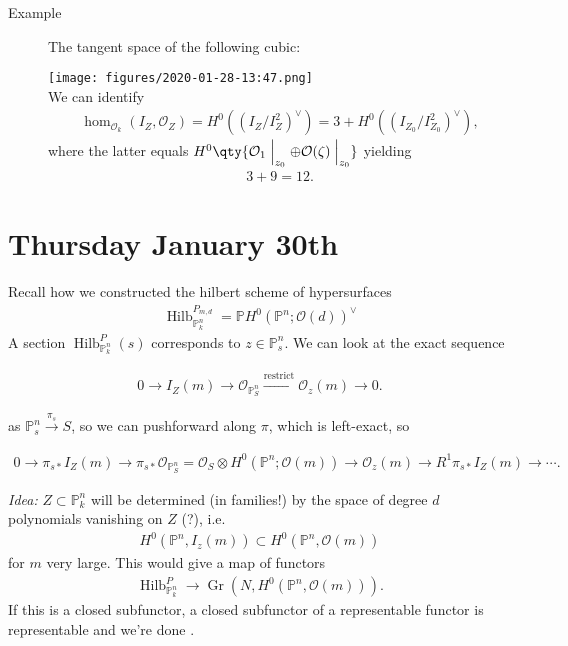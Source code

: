 \begin{description}
\item[Example]
The tangent space of the following cubic:

\texttt{[image: figures/2020-01-28-13:47.png]}\\

We can identify
\begin{align*}
\hom_{{\mathcal{O}}_k}(I_Z, {\mathcal{O}}_Z) = H^0((I_Z/I_Z^2)^\vee) = 3 + H^0((I_{Z_0}/I_{Z_0}^2)^\vee)
,\end{align*}
where the latter equals
\(H^0 \qty{ {\mathcal{O}}_1\mathrel{\Big|}_{z_0} \oplus {\mathcal{O}}(\zeta)\mathrel{\Big|}_{z_0} }\)
yielding
\begin{align*}
3+9 = 12
.\end{align*}
\end{description}

\hypertarget{thursday-january-30th}{%
\section{Thursday January 30th}\label{thursday-january-30th}}

Recall how we constructed the hilbert scheme of hypersurfaces
\begin{align*}
\operatorname{Hilb}_{{\mathbb{P}}_k^n}^{P_{m, d}} = {\mathbb{P}}H^0({\mathbb{P}}^n; {\mathcal{O}}(d))^\vee
\end{align*}
A section \(\operatorname{Hilb}_{{\mathbb{P}}_k^n}^{P}(s)\) corresponds
to \(z\in {\mathbb{P}}^n_s\). We can look at the exact sequence

\begin{align*} 0 \to I_Z(m) \to {\mathcal{O}}_{{\mathbb{P}}_S^n} \xrightarrow{\text{restrict}} {\mathcal{O}}_z(m) \to 0 .\end{align*}

as \({\mathbb{P}}_s^n \xrightarrow{\pi_s} S\), so we can pushforward
along \(\pi\), which is left-exact, so

\begin{align*} 0 \to \pi_{s*} I_Z(m) \to \pi_{s*} {\mathcal{O}}_{{\mathbb{P}}_S^n}  = {\mathcal{O}}_S \otimes H^0({\mathbb{P}}^n; {\mathcal{O}}(m)) \to {\mathcal{O}}_z(m) \to R^1 \pi_{s*} I_Z(m) \to \cdots .\end{align*}

\emph{Idea:} \(Z \subset {\mathbb{P}}_k^n\) will be determined (in
families!) by the space of degree \(d\) polynomials vanishing on \(Z\)
(?), i.e.
\begin{align*}
H^0({\mathbb{P}}^n, I_z(m)) \subset H^0({\mathbb{P}}^n, {\mathcal{O}}(m))
\end{align*}
for \(m\) very large. This would give a map of functors
\begin{align*}
\operatorname{Hilb}_{{\mathbb{P}}_k^n}^{P} \to {\operatorname{Gr}}(N, H^0({\mathbb{P}}^n, {\mathcal{O}}(m) ))
.\end{align*}
If this is a closed subfunctor, a closed subfunctor of a representable
functor is representable and we're done .

